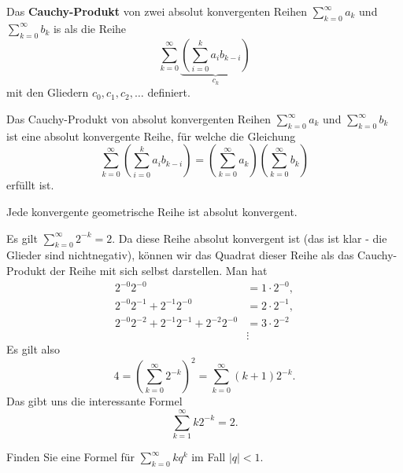 \begin{defn} Das \textbf{Cauchy-Produkt} von zwei absolut konvergenten Reihen $\sum_{k=0}^\infty a_k$ und $\sum_{k=0}^\infty b_k$ is als die Reihe
\[
	\sum_{k=0}^\infty \underbrace{\left( \sum_{i=0}^k a_i b_{k-i} \right)}_{c_k}
\]
mit den Gliedern $c_0,c_1,c_2,\ldots$ definiert. 
\end{defn} 

\begin{thm} 
	Das Cauchy-Produkt von absolut konvergenten Reihen $\sum_{k=0}^\infty a_k$ und $\sum_{k=0}^\infty b_k$ ist eine absolut konvergente Reihe, für welche die Gleichung
	\[
		\sum_{k=0}^\infty \left( \sum_{i=0}^k a_i b_{k-i} \right) = \left( \sum_{k=0}^\infty a_k \right) \left( \sum_{k=0}^ \infty b_k \right) 
	\]
	erfüllt ist. 
\end{thm} 

\begin{bsp} 
	Jede konvergente geometrische Reihe ist absolut konvergent. 
\end{bsp} 

\begin{bsp} 
	Es gilt $\sum_{k=0}^\infty 2^{-k} =  2$. Da diese Reihe absolut konvergent ist (das ist klar - die Glieder sind nichtnegativ), können wir das Quadrat dieser Reihe als das Cauchy-Produkt der Reihe mit sich selbst  darstellen. Man hat 
	\begin{align*} 
		 2^{-0} 2^{-0} & = 1 \cdot 2^{-0}, 
		\\ 2^{-0} 2^{-1} + 2^{-1} 2^{-0} & = 2 \cdot 2^{-1}, 
		\\ 2^{-0} 2^{-2} + 2^{-1} 2^{-1} + 2^{-2} 2^{-0} & = 3 \cdot 2^{-2}
		\\ & \vdots 
	\end{align*}
	Es gilt also 
	\[
		4 = \left( \sum_{k=0}^\infty 2^{-k} \right)^2 = \sum_{k=0}^\infty (k+1) 2^{-k}.
	\]
	Das gibt uns die interessante Formel
	\[
		\sum_{k=1}^\infty k 2^{-k} = 2. 
	\]
\end{bsp} 

\begin{aufg} 
	Finden Sie eine Formel für $\sum_{k=0}^\infty k q^k$ im Fall $|q| < 1$. 
\end{aufg} 

